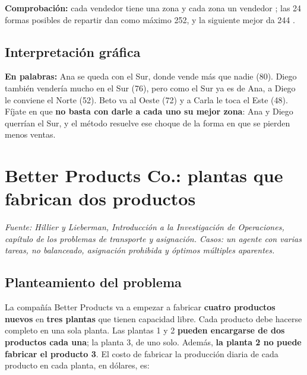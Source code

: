 \documentclass[11pt,a4paper]{article}
\begin{document}
\textbf{Comprobación:} cada vendedor tiene una zona y cada zona un vendedor \checkmark; las 24 formas posibles de
repartir dan como máximo 252, y la siguiente mejor da 244 \checkmark.

\subsection*{Interpretación gráfica}
\begin{minipage}[c]{0.50\textwidth}
\centering
{}
\end{minipage}\hfill
\begin{minipage}[c]{0.47\textwidth}
\textbf{En palabras:} Ana se queda con el Sur, donde vende más que nadie (80). Diego también vendería mucho en el
Sur (76), pero como el Sur ya es de Ana, a Diego le conviene el Norte (52). Beto va al Oeste (72) y a Carla le toca
el Este (48). Fíjate en que \textbf{no basta con darle a cada uno su mejor zona}: Ana y Diego querrían el Sur, y el
método resuelve ese choque de la forma en que se pierden menos ventas.
\end{minipage}

\section{Better Products Co.: plantas que fabrican dos productos}
\textit{Fuente: Hillier y Lieberman, Introducción a la Investigación de Operaciones, capítulo de los problemas
de transporte y asignación. Casos: un agente con varias tareas, no balanceado, asignación prohibida y óptimos
múltiples aparentes.}

\subsection*{Planteamiento del problema}
La compañía Better Products va a empezar a fabricar \textbf{cuatro productos nuevos} en \textbf{tres plantas}
que tienen capacidad libre. Cada producto debe hacerse completo en una sola planta. Las plantas 1 y 2
\textbf{pueden encargarse de dos productos cada una}; la planta 3, de uno solo. Además, \textbf{la planta 2 no
puede fabricar el producto 3}. El costo de fabricar la producción diaria de cada producto en cada planta, en
dólares, es:
\end{document}

